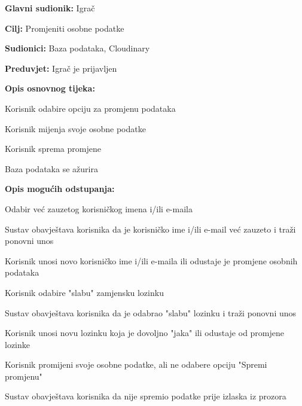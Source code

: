					\noindent {}
					\begin{packed_item}
					
					\item \textbf{Glavni sudionik: }Igrač
					\item  \textbf{Cilj:} Promjeniti osobne podatke
					\item  \textbf{Sudionici:} Baza podataka, Cloudinary
					\item  \textbf{Preduvjet:} Igrač je prijavljen
					\item  \textbf{Opis osnovnog tijeka:}
					
					\item[] \begin{packed_enum}
						
						\item Korisnik odabire opciju za promjenu podataka
						\item Korisnik mijenja svoje osobne podatke
						\item Korisnik sprema promjene
						\item Baza podataka se ažurira
					\end{packed_enum}
					
					\item  \textbf{Opis mogućih odstupanja:}
					
					\item[] \begin{packed_item}
						
						\item Odabir već zauzetog korisničkog imena i/ili e-maila
						\item[] \begin{packed_enum}
							
							\item Sustav obavještava korisnika da je korisničko ime i/ili e-mail već zauzeto i traži ponovni unos
							\item Korisnik unosi novo korisničko ime i/ili e-maila ili odustaje je promjene osobnih podataka
							
						\end{packed_enum}
						\item Korisnik odabire "slabu" zamjensku lozinku
						\item[] \begin{packed_enum}
							\item Sustav obavještava korisnika da je odabrao "slabu" lozinku i traži ponovni unos
							\item Korisnik unosi novu lozinku koja je dovoljno "jaka" ili odustaje od promjene lozinke
						\end{packed_enum}
						\item Korisnik promijeni svoje osobne podatke, ali ne odabere opciju "Spremi promjenu"
						\item[] \begin{packed_enum}
							\item Sustav obavještava korisnika da nije spremio podatke prije izlaska iz prozora
						\end{packed_enum}
						

\end{packed_item}
\end{packed_item}
